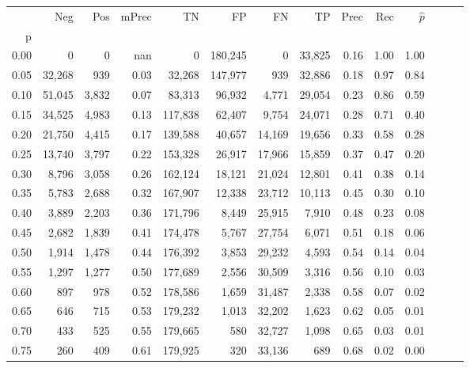 \begin{tabular}{rrrrrrrrrrrrrr}
\toprule
{} &     Neg &    Pos & mPrec &       TN &       FP &      FN &      TP &  Prec &   Rec & $\hat{p}$ \\
p    &         &        &       &          &          &         &         &       &       &           \\
\midrule
0.00 &       0 &      0 &   nan &        0 &  180,245 &       0 &  33,825 &  0.16 &  1.00 &      1.00 \\
0.05 &  32,268 &    939 &  0.03 &   32,268 &  147,977 &     939 &  32,886 &  0.18 &  0.97 &      0.84 \\
0.10 &  51,045 &  3,832 &  0.07 &   83,313 &   96,932 &   4,771 &  29,054 &  0.23 &  0.86 &      0.59 \\
0.15 &  34,525 &  4,983 &  0.13 &  117,838 &   62,407 &   9,754 &  24,071 &  0.28 &  0.71 &      0.40 \\
0.20 &  21,750 &  4,415 &  0.17 &  139,588 &   40,657 &  14,169 &  19,656 &  0.33 &  0.58 &      0.28 \\
0.25 &  13,740 &  3,797 &  0.22 &  153,328 &   26,917 &  17,966 &  15,859 &  0.37 &  0.47 &      0.20 \\
0.30 &   8,796 &  3,058 &  0.26 &  162,124 &   18,121 &  21,024 &  12,801 &  0.41 &  0.38 &      0.14 \\
0.35 &   5,783 &  2,688 &  0.32 &  167,907 &   12,338 &  23,712 &  10,113 &  0.45 &  0.30 &      0.10 \\
0.40 &   3,889 &  2,203 &  0.36 &  171,796 &    8,449 &  25,915 &   7,910 &  0.48 &  0.23 &      0.08 \\
0.45 &   2,682 &  1,839 &  0.41 &  174,478 &    5,767 &  27,754 &   6,071 &  0.51 &  0.18 &      0.06 \\
0.50 &   1,914 &  1,478 &  0.44 &  176,392 &    3,853 &  29,232 &   4,593 &  0.54 &  0.14 &      0.04 \\
0.55 &   1,297 &  1,277 &  0.50 &  177,689 &    2,556 &  30,509 &   3,316 &  0.56 &  0.10 &      0.03 \\
0.60 &     897 &    978 &  0.52 &  178,586 &    1,659 &  31,487 &   2,338 &  0.58 &  0.07 &      0.02 \\
0.65 &     646 &    715 &  0.53 &  179,232 &    1,013 &  32,202 &   1,623 &  0.62 &  0.05 &      0.01 \\
0.70 &     433 &    525 &  0.55 &  179,665 &      580 &  32,727 &   1,098 &  0.65 &  0.03 &      0.01 \\
0.75 &     260 &    409 &  0.61 &  179,925 &      320 &  33,136 &     689 &  0.68 &  0.02 &      0.00 \\

\end{tabular}
